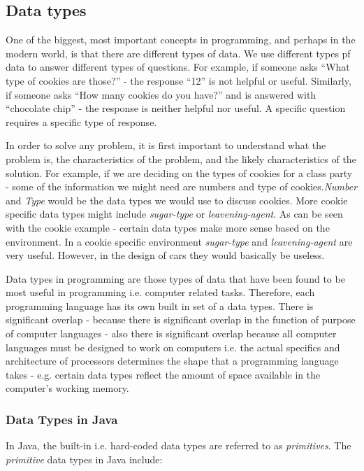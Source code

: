 \documentclass{article}
\begin{document}
\begin{flushleft}
\subsection{Data types}
  
One of the biggest, most important concepts in programming, and perhaps in the modern world, is that there are different types of data. We use different types pf data to answer different types of questions. For example, if someone asks ``What type of cookies are those?'' - the response ``12'' is not helpful or useful. Similarly, if someone asks ``How many cookies do you have?'' and is answered with ``chocolate chip'' - the response is neither helpful nor useful. A specific question requires a specific type of response.\par
In order to solve any problem, it is first important to understand what the problem is, the characteristics of the problem, and the likely characteristics of the solution. For example, if we are deciding on the types of cookies for a class party - some of the information we might need are numbers and type of cookies.\emph{Number} and \emph{Type} would be the data types we would use to discuss cookies. More cookie specific data types might include \emph{sugar-type} or \emph{leavening-agent}. As can be seen with the cookie example - certain data types make more sense based on the environment. In a cookie specific environment \emph{sugar-type} and \emph{leavening-agent} are very useful. However, in the design of cars they would basically be useless.\par
Data types in programming are those types of data that have been found to be most useful in programming i.e. computer related tasks. Therefore, each programming language has its own built in set of a data types. There is significant overlap - because there is significant overlap in the function of purpose of computer languages - also there is significant overlap because all computer languages must be designed to work on computers i.e. the actual specifics and architecture of processors determines the shape that a programming language takes - e.g. certain data types reflect the amount of space available in the computer's working memory. \par
\subsubsection{Data Types in Java}
In Java, the built-in i.e. hard-coded data types are referred to as \emph{primitives}. The \emph{primitive} data types in Java include:


\end{flushleft}
\end{document}
